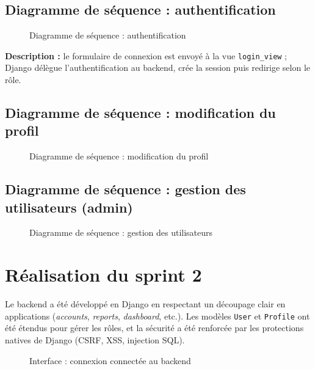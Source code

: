 \subsection{Diagramme de séquence : authentification}
\begin{figure}[h!]
\centering
{}
\caption{Diagramme de séquence : authentification}
\end{figure}

\textbf{Description :} le formulaire de connexion est envoyé à la vue
\texttt{login\_view} ; Django délègue l'authentification au backend, crée la session
puis redirige selon le rôle.

\subsection{Diagramme de séquence : modification du profil}
\begin{figure}[h!]
\centering
{}
\caption{Diagramme de séquence : modification du profil}
\end{figure}

\subsection{Diagramme de séquence : gestion des utilisateurs (admin)}
\begin{figure}[h!]
\centering
{}
\caption{Diagramme de séquence : gestion des utilisateurs}
\end{figure}

\section{Réalisation du sprint 2}
Le backend a été développé en Django en respectant un découpage clair en applications
(\emph{accounts}, \emph{reports}, \emph{dashboard}, etc.). Les modèles \texttt{User}
et \texttt{Profile} ont été étendus pour gérer les rôles, et la sécurité a été
renforcée par les protections natives de Django (CSRF, XSS, injection SQL).

\begin{figure}[h!]
\centering
{}
\caption{Interface : connexion connectée au backend}
\end{figure}

